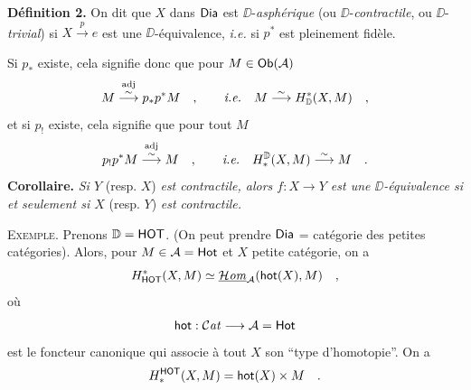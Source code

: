 \noindent\textbf{Définition 2.} On dit que $X$ dans $\mathsf{Dia}$ est $\DD$-\textit{asphérique} (ou $\DD$-\textit{contractile}, ou $\DD$-\textit{trivial}) si $X \overset{p}{\to} e$ est une $\DD$-équivalence, \textit{i.e.} si $p^*$ est pleinement fidèle.

Si $p_*$ existe, cela signifie donc que pour $M \in \mathsf{Ob}(\mathcal{A})$
\[
M \overset{\mathrm{adj}}{\overset{\sim}{\longrightarrow}} p_*p^*M \quad , \qquad \textit{i.e.} \quad M \overset{\sim}{\longrightarrow} H^*_{\mathbb{D}}(X, M) \quad ,
\]
et si $p_!$ existe, cela signifie que pour tout $M$
\[
p_!p^*M \overset{\mathrm{adj}}{\overset{\sim}{\longrightarrow}} M \quad , \qquad \textit{i.e.} \quad H^{\mathbb{D}}_*(X, M) \overset{\sim}{\longrightarrow} M \quad .
\]
\textbf{Corollaire.} \textit{Si $Y$} (resp. $X$) \textit{est contractile, alors $f : X \to Y$ est une $\DD$-équivalence si et seulement si $X$} (resp. $Y$) \textit{est contractile.}

\noindent\textsc{Exemple}. Prenons $\mathbb{D} = \mathsf{HOT}$. (On peut prendre $\mathsf{Dia}$ = catégorie des petites catégories). Alors, pour $M \in \mathcal{A} = \mathsf{Hot}$ et $X$ petite catégorie, on a
\[
H^*_{\mathsf{HOT}}(X, M) \simeq \underline{\mathcal{H}\mathit{om}}_{\mathcal{A}}(\mathsf{hot}(X), M) \quad ,
\]
où
\[
\mathsf{hot} : \mathcal{C}\mathit{at} \longrightarrow \mathcal{A} = \mathsf{Hot}
\]
est le foncteur canonique qui associe à tout $X$ son “type d'homotopie”. On a
\[
H^{\mathsf{HOT}}_*(X, M) = \mathsf{hot}(X) \times M \quad .
\]

\noindent{}

